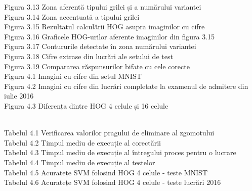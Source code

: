 \documentclass[a4paper,12pt]{report}
\newcommand\tab[1][1cm]{\hspace*{#1}}
\begin{document}
Figura 3.13 \hspace{2mm} Zona aferentă tipului grilei și a numărului variantei\\
Figura 3.14 \hspace{2mm} Zona accentuată a tipului grilei\\
Figura 3.15 \hspace{2mm} Rezultatul calculării HOG asupra imaginilor cu cifre\\
Figura 3.16 \hspace{2mm} Graficele HOG-urilor aferente imaginilor din figura 3.15\\
Figura 3.17 \hspace{2mm} Contururile detectate în zona numărului variantei\\
Figura 3.18 \hspace{2mm} Cifre extrase din lucrări ale setului de test\\
Figura 3.19 \hspace{2mm} Compararea răspunsurilor bifate cu cele corecte\\
Figura 4.1 \hspace{2mm} Imagini cu cifre din setul MNIST\\
Figura 4.2 \hspace{2mm} Imagini cu cifre din lucrări completate la examenul de admitere din iulie 2016\\
Figura 4.3 \hspace{2mm} Diferența dintre HOG 4 celule și 16 celule\\
\listoftables
\tab \\
Tabelul 4.1 \hspace{2mm} Verificarea valorilor pragului de eliminare al zgomotului\\
Tabelul 4.2 \hspace{2mm} Timpul mediu de execuție al corectării\\ 
Tabelul 4.3 \hspace{2mm} Timpul mediu de execuție al întregului proces pentru o lucrare\\  
Tabelul 4.4 \hspace{2mm} Timpul mediu de execuție al testelor\\  
Tabelul 4.5 \hspace{2mm} Acuratețe SVM folosind HOG 4 celule - teste MNIST\\  
Tabelul 4.6 \hspace{2mm} Acuratețe SVM folosind HOG 4 celule - teste lucrări 2016\\  
\end{document}
